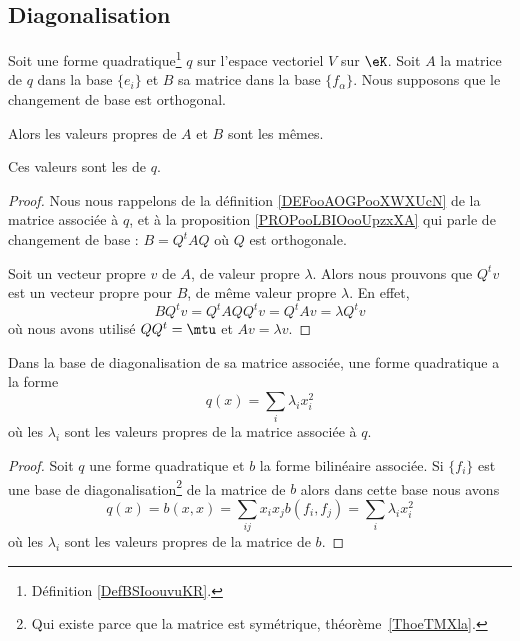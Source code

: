 \subsection{Diagonalisation}

\begin{lemmaDef}        \label{DEFooGVGGooWQEIET}
	Soit une forme quadratique\footnote{Définition \ref{DefBSIoouvuKR}.} \( q\) sur l'espace vectoriel \( V\) sur \( \eK\). Soit \( A\) la matrice de \( q\) dans la base \( \{ e_i \}\) et \( B\) sa matrice dans la base \( \{f_{\alpha}  \}\). Nous supposons que le changement de base est orthogonal.

	Alors les valeurs propres de \( A\) et \( B\) sont les mêmes.

	Ces valeurs sont les  de \( q\).
\end{lemmaDef}

\begin{proof}
	Nous nous rappelons de la définition \ref{DEFooAOGPooXWXUcN} de la matrice associée à \( q\), et à la proposition \ref{PROPooLBIOooUpzxXA} qui parle de changement de base : \( B=Q^tAQ\) où \( Q\) est orthogonale.

	Soit un vecteur propre \( v\) de \(A \), de valeur propre \( \lambda\). Alors nous prouvons que \( Q^tv\) est un vecteur propre pour \( B\), de même valeur propre \( \lambda\). En effet,
	\begin{equation}
		BQ^tv=Q^tAQQ^tv=Q^tAv=\lambda Q^tv
	\end{equation}
	où nous avons utilisé \( QQ^t=\mtu\) et \( Av=\lambda v\).
\end{proof}

\begin{proposition}\label{PropFWYooQXfcVY}
	Dans la base de diagonalisation de sa matrice associée, une forme quadratique a la forme
	\begin{equation}
		q(x)=\sum_i\lambda_ix_i^2
	\end{equation}
	où les \( \lambda_i\) sont les valeurs propres de la matrice associée à \( q\).
\end{proposition}

\begin{proof}
	Soit \( q\) une forme quadratique et \( b\) la forme bilinéaire associée. Si \( \{ f_i \}\) est une base de diagonalisation\footnote{Qui existe parce que la matrice est symétrique, théorème~\ref{ThoeTMXla}.} de la matrice de \( b\) alors dans cette base nous avons
	\begin{equation}
		q(x)=b(x,x)=\sum_{ij}x_ix_jb(f_i,f_j)=\sum_i\lambda_ix_i^2
	\end{equation}
	où les \( \lambda_i\) sont les valeurs propres de la matrice de \( b\).
\end{proof}

